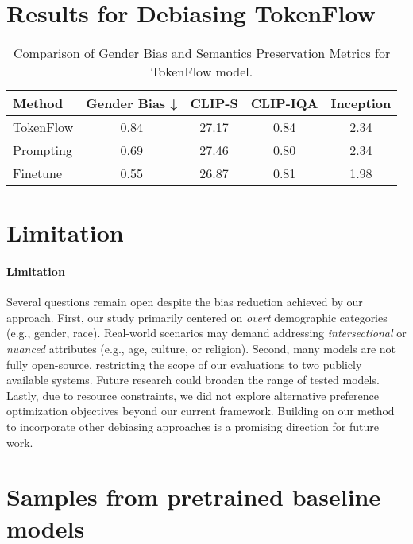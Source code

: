 \section{Results for Debiasing TokenFlow}

\begin{table}[ht]
    \centering
    \small %
    \setlength{\tabcolsep}{2pt} %
    \vspace{-1.5em}
    \caption{Comparison of Gender Bias and Semantics Preservation Metrics for TokenFlow model.}
    \label{tab:tokenflow_comparison}
    \begin{tabular}{l|c|ccc}
        \toprule
        \textbf{Method} & \textbf{Gender Bias ↓} & \textbf{CLIP-S} & \textbf{CLIP-IQA} & \textbf{Inception} \\
        \midrule
        TokenFlow & 0.84 & 27.17 & 0.84 & 2.34 \\
        Prompting & 0.69 & 27.46 & 0.80 & 2.34 \\
        Finetune & 0.55 & 26.87 & 0.81 & 1.98 \\
        \bottomrule
    \end{tabular}
\end{table}

\section{Limitation}
\label{sec:limitation}
\paragraph{Limitation}
Several questions remain open despite the bias reduction achieved by our approach. First, our study primarily centered on \emph{overt} demographic categories (e.g., gender, race). Real-world scenarios may demand addressing \emph{intersectional} or \emph{nuanced} attributes (e.g., age, culture, or religion). Second, many models are not fully open-source, restricting the scope of our evaluations to two publicly available systems. Future research could broaden the range of tested models. Lastly, due to resource constraints, we did not explore alternative preference optimization objectives beyond our current framework. Building on our method to incorporate other debiasing approaches is a promising direction for future work. 


\newpage
\section{Samples from pretrained baseline models}

